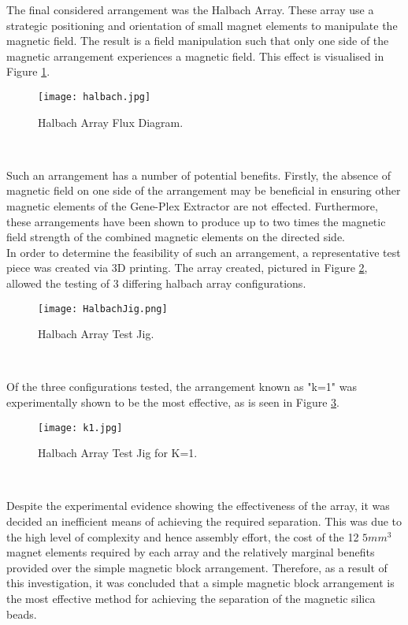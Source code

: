 The final considered arrangement was the Halbach Array. These array use a strategic positioning and orientation of small magnet elements to manipulate the magnetic field. The result is a field manipulation such that only one side of the magnetic arrangement experiences a magnetic field. This effect is visualised in Figure \ref{fig:halbach}.

\begin{figure}[!htb]
	\centering
	\texttt{[image: halbach.jpg]}
	\caption[Halbach Array Flux Diagram.]{Halbach Array Flux Diagram.}
	\label{fig:halbach}
\end{figure} 
\FloatBarrier

Such an arrangement has a number of potential benefits. Firstly, the absence of magnetic field on one side of the arrangement may be beneficial in ensuring other magnetic elements of the Gene-Plex Extractor are not effected. Furthermore, these arrangements have been shown to produce up to two times the magnetic field strength of the combined magnetic elements on the directed side.\\

In order to determine the feasibility of such an arrangement, a representative test piece was created via 3D printing. The array created, pictured in Figure \ref{fig:HalbachJig}, allowed the testing of 3 differing halbach array configurations. 

\begin{figure}[!htb]
	\centering
	\texttt{[image: HalbachJig.png]}
	\caption[Halbach Array Jig.]{Halbach Array Test Jig. \cite{halbach}}
	\label{fig:HalbachJig}
\end{figure} 
\FloatBarrier

Of the three configurations tested, the arrangement known as "k=1" was experimentally shown to be the most effective, as is seen in Figure \ref{fig:k1}.

\begin{figure}[!htb]
	\centering
	\texttt{[image: k1.jpg]}
	\caption[Halbach Array Jig - K=1.]{Halbach Array Test Jig for K=1.}
	\label{fig:k1}
\end{figure} 
\FloatBarrier

Despite the experimental evidence showing the effectiveness of the array, it was decided an inefficient means of achieving the required separation. This was due to the high level of complexity and hence assembly effort, the cost of the 12 $5mm^3$ magnet elements required by each array and the relatively marginal benefits provided over the simple magnetic block arrangement. Therefore, as a result of this investigation, it was concluded that a simple magnetic block arrangement is the most effective method for achieving the separation of the magnetic silica beads.\\

